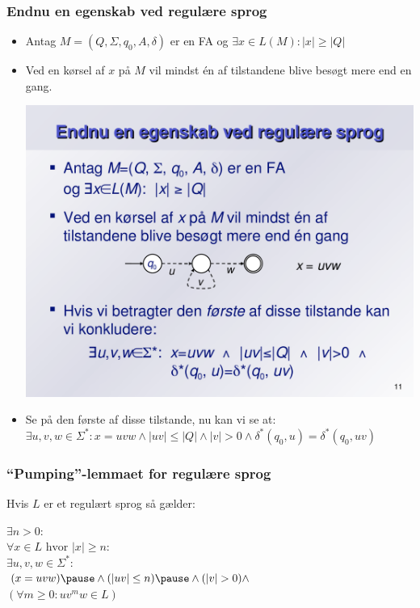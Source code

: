 \documentclass{beamer}
\begin{document}
\begin{frame}
\frametitle{Endnu en egenskab ved regulære sprog}
\begin{itemize}[<+->]
\item Antag $M=(Q, \Sigma, q_0, A, \delta)$ er en FA og $\exists x\in L(M): |x| \geq |Q|$
\item Ved en kørsel af $x$ på $M$ vil mindst én af tilstandene blive
  besøgt mere end en gang.
    \begin{center}
    \includegraphics[scale=.40]{images/pumping}
    \end{center}
\item Se på den første af disse tilstande, nu kan vi se at:
  $\exists u,v,w\in \Sigma^*: x=uvw \wedge |uv| \leq |Q| \wedge |v|>0 \wedge
  \delta^*(q_0,u)=\delta^*(q_0,uv)$
\end{itemize}
\end{frame}

\begin{frame}
\frametitle{``Pumping''-lemmaet for regulære sprog}
Hvis $L$ er et regulært sprog så gælder:

\hspace{1cm}$\exists n>0:$\\
\pause
\hspace{2cm}$\forall x\in L \text{ hvor } |x| \geq n:$\\
\pause
\hspace{3cm}$\exists u,v,w\in \Sigma^*:$\\
\pause
\hspace{4cm}$(x = uvw) \pause \wedge (|uv|\leq n) \pause \wedge (|v| > 0) \wedge$\\
\pause
\hspace{4cm}$(\forall m\geq 0: uv^mw\in L)$\\
\pause
\end{frame}
\end{document}
